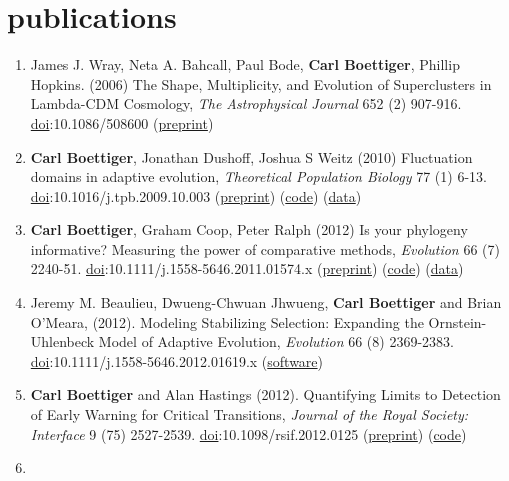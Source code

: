 \documentclass[11pt,a4paper,sans]{moderncv}        %
\makeatletter
\renewcommand{\labelenumi}{\@biblabel{\theenumi}} %
\makeatother
\begin{document}
\section{publications}\label{publications}

\begin{enumerate}
\def\labelenumi{\arabic{enumi}.}
\item
  James J. Wray, Neta A. Bahcall, Paul Bode, \textbf{Carl Boettiger},
  Phillip Hopkins. (2006) The Shape, Multiplicity, and Evolution of
  Superclusters in Lambda-CDM Cosmology, \emph{The Astrophysical
  Journal} 652 (2) 907-916.
  \href{http://dx.doi.org/10.1086/508600}{doi}:10.1086/508600
  (\href{http://arxiv.org/abs/astro-ph/0603060}{preprint})
\item
  \textbf{Carl Boettiger}, Jonathan Dushoff, Joshua S Weitz (2010)
  Fluctuation domains in adaptive evolution, \emph{Theoretical
  Population Biology} 77 (1) 6-13.
  \href{http://dx.doi.org/10.1016/j.tpb.2009.10.003}{doi}:10.1016/j.tpb.2009.10.003
  (\href{http://arxiv.org/abs/1004.4233}{preprint})
  (\href{https://github.com/cboettig/fluctuationDomains}{code})
  (\href{http://datadryad.org/handle/10255/dryad.37625}{data})
\item
  \textbf{Carl Boettiger}, Graham Coop, Peter Ralph (2012) Is your
  phylogeny informative? Measuring the power of comparative methods,
  \emph{Evolution} 66 (7) 2240-51.
  \href{http://dx.doi.org/10.1111/j.1558-5646.2011.01574.x}{doi}:10.1111/j.1558-5646.2011.01574.x
  (\href{http://arxiv.org/abs/1110.4944}{preprint})
  (\href{https://github.com/cboettig/pmc}{code})
  (\href{http://datadryad.org/handle/10255/dryad.37645}{data})
\item
  Jeremy M. Beaulieu, Dwueng-Chwuan Jhwueng, \textbf{Carl Boettiger} and
  Brian O'Meara, (2012). Modeling Stabilizing Selection: Expanding the
  Ornstein-Uhlenbeck Model of Adaptive Evolution, \emph{Evolution} 66
  (8) 2369-2383.
  \href{http://dx.doi.org/10.1111/j.1558-5646.2012.01619.x}{doi}:10.1111/j.1558-5646.2012.01619.x
  (\href{http://cran.r-project.org/web/packages/OUwie/index.html}{software})
\item
  \textbf{Carl Boettiger} and Alan Hastings (2012). Quantifying Limits
  to Detection of Early Warning for Critical Transitions, \emph{Journal
  of the Royal Society: Interface} 9 (75) 2527-2539.
  \href{http://dx.doi.org/10.1098/rsif.2012.0125}{doi}:10.1098/rsif.2012.0125
  (\href{http://arxiv.org/abs/1204.6231}{preprint})
  (\href{https://github.com/cboettig/earlywarning}{code})
\item

\end{enumerate}
\end{document}
